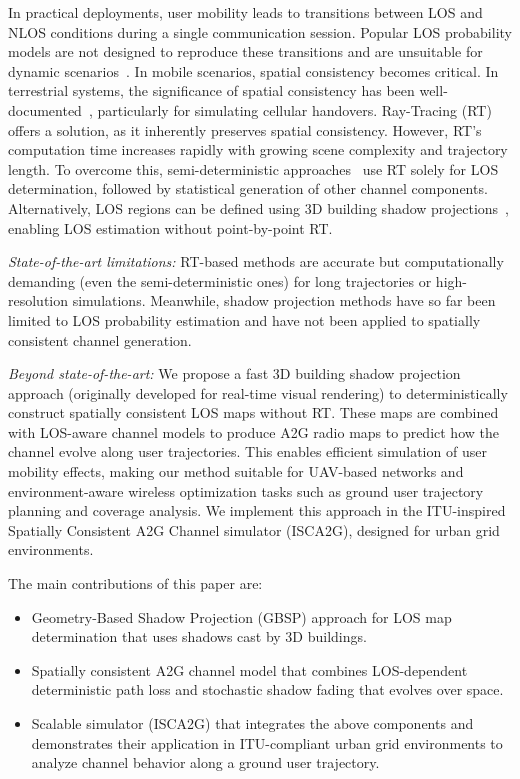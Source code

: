 \documentclass[10pt,conference]{IEEEtran}
\begin{document}
In practical deployments, user mobility leads to transitions between LOS and NLOS conditions during a single communication session. Popular LOS probability models are not designed to reproduce these transitions and are unsuitable for dynamic scenarios~\cite{vinogradov2025prob}. In mobile scenarios, spatial consistency becomes critical. In terrestrial systems, the significance of spatial consistency has been well-documented~\cite{Karttunen2017spatial}, particularly for simulating cellular handovers. Ray-Tracing (RT) offers a solution, as it inherently preserves spatial consistency. However, RT’s computation time increases rapidly with growing scene complexity and trajectory length. To overcome this, semi-deterministic approaches~\cite{Colpaert2020handover,Li2021semideterministic, saboor2025cash} use RT solely for LOS determination, followed by statistical generation of other channel components. Alternatively, LOS regions can be defined using 3D building shadow projections~\cite{Kim2023features,cho2025placement}, enabling LOS estimation without point-by-point RT. 

\textit{State-of-the-art limitations:} RT-based methods are accurate but computationally demanding (even the semi-deterministic ones) for long trajectories or high-resolution simulations. Meanwhile, shadow projection methods have so far been limited to LOS probability estimation and have not been applied to spatially consistent channel generation.

\textit{Beyond state-of-the-art:} We propose a fast 3D building shadow projection approach (originally developed for real-time visual rendering) to deterministically construct spatially consistent LOS maps without RT. These maps are combined with LOS-aware channel models to produce A2G radio maps to predict how the channel evolve along user trajectories. This enables efficient simulation of user mobility effects, making our method suitable for UAV-based networks and environment-aware wireless optimization tasks such as ground user trajectory planning and coverage analysis. We implement this approach in the ITU-inspired Spatially Consistent A2G Channel simulator (ISCA2G), designed for urban grid environments.

The main contributions of this paper are:
\begin{itemize} 
\item Geometry-Based Shadow Projection (GBSP) approach for LOS map determination that uses shadows cast by 3D buildings. 
\item Spatially consistent A2G channel model that combines LOS-dependent deterministic path loss and stochastic shadow fading that evolves over space. 
\item Scalable simulator (ISCA2G) that integrates the above components and demonstrates their application in ITU-compliant urban grid environments to analyze channel behavior along a ground user trajectory.
\end{itemize}
\end{document}
